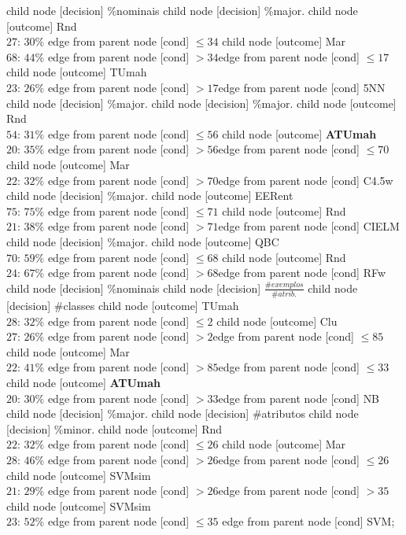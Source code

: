 child {node [decision] {\%nominais}
child {node [decision] {\%major.}
child {node [outcome] {Rnd \\$27$: $30\%$} edge from parent node [cond] {$\leq34$}}
child {node [outcome] {Mar \\$68$: $44\%$} edge from parent node [cond] {$>34$}}edge from parent node [cond] {$\leq17$}}
child {node [outcome] {TUmah \\$23$: $26\%$} edge from parent node [cond] {$>17$}}edge from parent node [cond] {5NN}}
child {node [decision] {\%major.}
child {node [decision] {\%major.}
child {node [outcome] {Rnd \\$54$: $31\%$} edge from parent node [cond] {$\leq56$}}
child {node [outcome] {\textbf{ATUmah} \\$20$: $35\%$} edge from parent node [cond] {$>56$}}edge from parent node [cond] {$\leq70$}}
child {node [outcome] {Mar \\$22$: $32\%$} edge from parent node [cond] {$>70$}}edge from parent node [cond] {C4.5w}}
child {node [decision] {\%major.}
child {node [outcome] {EERent \\$75$: $75\%$} edge from parent node [cond] {$\leq71$}}
child {node [outcome] {Rnd \\$21$: $38\%$} edge from parent node [cond] {$>71$}}edge from parent node [cond] {CIELM}}
child {node [decision] {\%major.}
child {node [outcome] {QBC \\$70$: $59\%$} edge from parent node [cond] {$\leq68$}}
child {node [outcome] {Rnd \\$24$: $67\%$} edge from parent node [cond] {$>68$}}edge from parent node [cond] {RFw}}
child {node [decision] {\%nominais}
child {node [decision] {$\frac{\#exemplos}{\#atrib.}$}
child {node [decision] {\#classes}
child {node [outcome] {TUmah \\$28$: $32\%$} edge from parent node [cond] {$\leq2$}}
child {node [outcome] {Clu \\$27$: $26\%$} edge from parent node [cond] {$>2$}}edge from parent node [cond] {$\leq85$}}
child {node [outcome] {Mar \\$22$: $41\%$} edge from parent node [cond] {$>85$}}edge from parent node [cond] {$\leq33$}}
child {node [outcome] {\textbf{ATUmah} \\$20$: $30\%$} edge from parent node [cond] {$>33$}}edge from parent node [cond] {NB}}
child {node [decision] {\%major.}
child {node [decision] {\#atributos}
child {node [decision] {\%minor.}
child {node [outcome] {Rnd \\$22$: $32\%$} edge from parent node [cond] {$\leq26$}}
child {node [outcome] {Mar \\$28$: $46\%$} edge from parent node [cond] {$>26$}}edge from parent node [cond] {$\leq26$}}
child {node [outcome] {SVMsim \\$21$: $29\%$} edge from parent node [cond] {$>26$}}edge from parent node [cond] {$>35$}}
child {node [outcome] {SVMsim \\$23$: $52\%$} edge from parent node [cond] {$\leq35$}}
edge from parent node [cond] {SVM}};